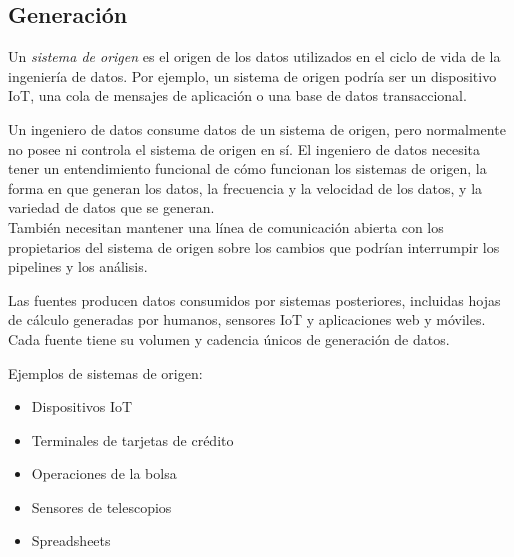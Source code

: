 \documentclass[12pt]{book}
\begin{document}
\subsection{Generación}

Un \textit{sistema de origen} es el origen de los datos utilizados en el ciclo de vida de la ingeniería de datos. Por ejemplo, un sistema de origen podría ser un dispositivo IoT, una cola de mensajes de aplicación o una base de datos transaccional.

Un ingeniero de datos consume datos de un sistema de origen, pero normalmente no posee ni controla el sistema de origen en sí. El ingeniero de datos necesita tener un entendimiento funcional de cómo funcionan los sistemas de origen, la forma en que generan los datos, la frecuencia y la velocidad de los datos, y la variedad de datos que se generan.\\
También necesitan mantener una línea de comunicación abierta con los propietarios del sistema de origen sobre los cambios que podrían interrumpir los pipelines y los análisis.

Las fuentes producen datos consumidos por sistemas posteriores, incluidas hojas de cálculo generadas por humanos, sensores IoT y aplicaciones web y móviles. Cada fuente tiene su volumen y cadencia únicos de generación de datos.

Ejemplos de sistemas de origen: 
\begin{itemize}
    \item Dispositivos IoT
    \item Terminales de tarjetas de crédito
    \item Operaciones de la bolsa
    \item Sensores de telescopios
    \item Spreadsheets
\end{itemize}
\end{document}
